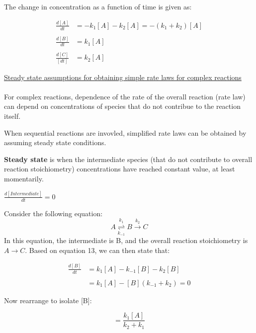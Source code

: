 \documentclass[12pt, letterpaper]{article}
\begin{document}
    The change in concentration as a function of time is given as: 

    \begin{align*}
        \frac{d[A]}{dt} &= -k_1[A] - k_2[A] = -(k_1 + k_2)[A] \\ \\
        \frac{d[B]}{dt} &= k_1[A] \\ \\
        \frac{d[C]}{[dt]} &= k_2[A]  
    \end{align*}

    \underline{Steady state assumptions for obtaining simple rate laws for complex reactions} \\ \\
    For complex reactions, dependence of the rate of the overall reaction (rate law) can depend on concentrations
    of species that do not contribue to the reaction itself.

    When sequential reactions are invovled, simplified rate laws can be obtained by assuming steady state conditions. 

    \textbf{Steady state} is when the intermediate species (that do not contribute to overall reaction stoichiometry) concentrations have reached
    constant value, at least momentarily.

    \begin{center}
        \( \frac{d[Intermediate]}{dt} = 0 \)
    \end{center}

    Consider the following equation: 
    \begin{equation}
        A \stackrel{k_1}{\underset{k_{-1}}{\rightleftharpoons}} B \stackrel{k_2} \longrightarrow C
    \end{equation}
    In this equation, the intermediate is B, and the overall reaction stoichiometry is \(A \longrightarrow C \).
    Based on equation 13, we can then state that: 

    \begin{align*}
        \frac{d[B]}{dt} &= k_1[A] - k_{-1}[B] - k_2[B] \\ \\
        &= k_1[A] - [B](k_{-1} + k_2) = 0
    \end{align*}

    Now rearrange to isolate [B]: 

    \begin{equation}
        [B] = \frac{k_1[A]}{k_2 + k_1} 
    \end{equation}
\end{document}
